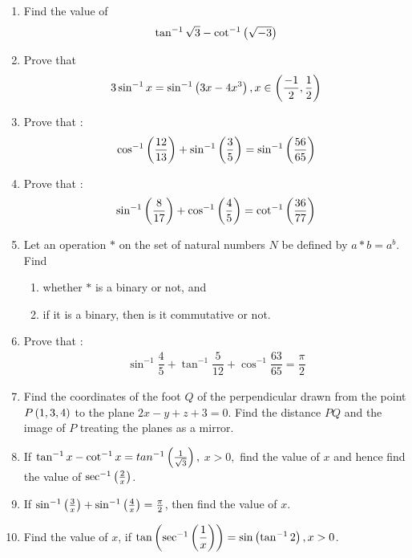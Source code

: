 \begin{enumerate}
\item Find the value of
	\begin{align*}
		\tan^{-1}\sqrt{3}-\cot^{-1}\left(\sqrt{-3}\right)
	\end{align*}
 \item Prove that 
			\begin{align*}
		3\sin^{-1}x=\sin^{-1}\left(3x-4x^3\right), x\in\left(\frac{-1}{2},\frac{1}{2}\right)
			\end{align*} 

\item Prove that :
	\begin{align*}
		\cos^{-1}\left(\frac{12}{13}\right)+\sin^{-1}\left(\frac{3}{5}\right)=\sin^{-1} \left(\frac{56}{65}\right)
	\end{align*}
 \item Prove that :
         \begin{align}
          \sin^{-1}\left(\dfrac{8}{17}\right)+\cos^{-1}\left(\dfrac{4}{5}\right)=\cot^{-1}\left(\dfrac{36}{77}\right)
         \end{align}
	 \item Let an operation $\ast$ on the set of natural numbers $N$ be defined by $a \ast b = a^{b}$. Find 
  \begin{enumerate}
    \item whether $\ast$ is a binary or not, and 
    \item if it is a binary, then is it commutative or not.
  \end{enumerate}

\item Prove that :
    \begin{align*}
       \sin^{-1}\dfrac{4}{5}+\tan^{-1}\dfrac{5}{12}+\cos^{-1}\dfrac{63}{65}=\dfrac{\pi}{2}
    \end{align*}

\item Find the coordinates of the foot $Q$ of the perpendicular drawn from the point $P\left(1,3,4\right)$ to the plane $2x-y+z+3=0$. Find the distance $PQ$ and the image of $P$ treating the planes as a mirror.


\item If $\tan^{-1}{x} - \cot^{-1} {x}= tan^{-1}\left(\frac{1}{\sqrt{3}}\right),$ $x > 0,$ find the value of $x$ and hence find the value of $\sec^{-1}\left(\frac{2}{x}\right)$.
 \item If $\sin^{-1}\left(\frac{3}{x}\right) + \sin^{-1}\left(\frac{4}{x}\right) = \frac{\pi}{2}$, then find the value of $x$.
 \item Find  the value of $x$, if $\tan\left(\sec^{-1}\left(\dfrac{1}{x}\right)\right)  = \sin \left(\tan^{-1}{2}\right),x>0$.

\end{enumerate}
